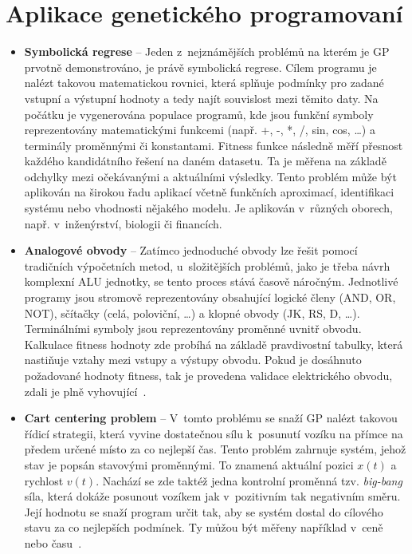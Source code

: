 \section{Aplikace genetického programovaní}
\begin{itemize}
    \item \textbf{Symbolická regrese} -- Jeden z~nejznámějších problémů na kterém je GP prvotně demonstrováno, je právě symbolická regrese. Cílem programu je nalézt takovou matematickou rovnici, která splňuje podmínky pro zadané vstupní a výstupní hodnoty a tedy najít souvislost mezi těmito daty. Na počátku je vygenerována populace programů, kde jsou funkční symboly reprezentovány matematickými funkcemi (např. +, -, *, /, sin, cos, \dots) a terminály proměnnými či konstantami. Fitness funkce následně měří přesnost každého kandidátního řešení na daném datasetu. Ta je měřena na základě odchylky mezi očekávanými a aktuálními výsledky. Tento problém může být aplikován na širokou řadu aplikací včetně funkčních aproximací, identifikaci systému nebo vhodnosti nějakého modelu. Je aplikován v~různých oborech, např. v~inženýrství, biologii či financích.

    \item \textbf{Analogové obvody} --  Zatímco jednoduché obvody lze řešit pomocí tradičních výpočetních metod, u~složitějších problémů, jako je třeba návrh komplexní ALU jednotky, se tento proces stává časově náročným. Jednotlivé programy jsou stromově reprezentovány obsahující logické členy (AND, OR, NOT), sčítačky (celá, poloviční, \dots) a klopné obvody (JK, RS, D, \dots). Terminálními symboly jsou reprezentovány proměnné uvnitř obvodu. Kalkulace fitness hodnoty zde probíhá na základě pravdivostní tabulky, která nastiňuje vztahy mezi vstupy a výstupy obvodu. Pokud je dosáhnuto požadované hodnoty fitness, tak je provedena validace elektrického obvodu, zdali je plně vyhovující~\cite{analog_digital_circuits}.
    
    \item \textbf{Cart centering problem} -- V~tomto problému se snaží GP nalézt takovou řídicí strategii, která vyvine dostatečnou sílu k~posunutí vozíku na přímce na předem určené místo za co nejlepší čas. Tento problém zahrnuje systém, jehož stav je popsán stavovými proměnnými. To znamená aktuální pozici $x(t)$ a rychlost $v(t)$. Nachází se zde taktéž jedna kontrolní proměnná tzv. \emph{big-bang} síla, která dokáže posunout vozíkem jak v~pozitivním tak negativním směru. Její hodnotu se snaží program určit tak, aby se systém dostal do cílového stavu za co nejlepších podmínek. Ty můžou být měřeny například v~ceně nebo času~\cite{Brameier1998}.
\end{itemize}

